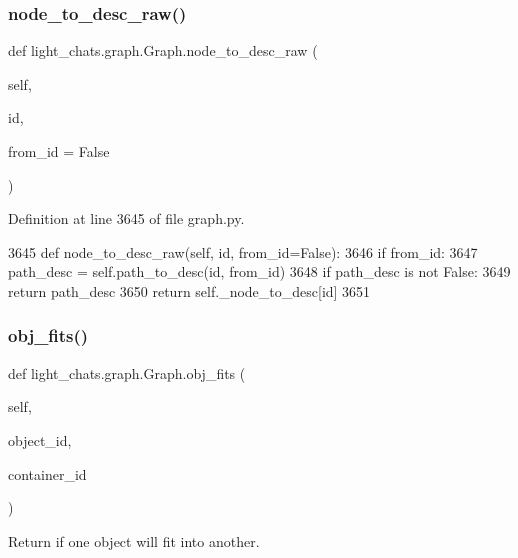 \subsubsection{\texorpdfstring{node\+\_\+to\+\_\+desc\+\_\+raw()}{node\_to\_desc\_raw()}}
{\footnotesize\ttfamily def light\+\_\+chats.\+graph.\+Graph.\+node\+\_\+to\+\_\+desc\+\_\+raw (\begin{DoxyParamCaption}\item[{}]{self,  }\item[{}]{id,  }\item[{}]{from\+\_\+id = {\ttfamily False} }\end{DoxyParamCaption})}



Definition at line 3645 of file graph.\+py.


\begin{DoxyCode}
3645     \textcolor{keyword}{def }node\_to\_desc\_raw(self, id, from\_id=False):
3646         \textcolor{keywordflow}{if} from\_id:
3647             path\_desc = self.path\_to\_desc(id, from\_id)
3648             \textcolor{keywordflow}{if} path\_desc \textcolor{keywordflow}{is} \textcolor{keywordflow}{not} \textcolor{keyword}{False}:
3649                 \textcolor{keywordflow}{return} path\_desc
3650         \textcolor{keywordflow}{return} self.\_node\_to\_desc[id]
3651 
\end{DoxyCode}
\mbox{\label{classlight__chats_1_1graph_1_1Graph_af7460b9c8069563289b8b6b11f831b63}} 
\subsubsection{\texorpdfstring{obj\+\_\+fits()}{obj\_fits()}}
{\footnotesize\ttfamily def light\+\_\+chats.\+graph.\+Graph.\+obj\+\_\+fits (\begin{DoxyParamCaption}\item[{}]{self,  }\item[{}]{object\+\_\+id,  }\item[{}]{container\+\_\+id }\end{DoxyParamCaption})}

\begin{DoxyVerb}Return if one object will fit into another.
\end{DoxyVerb}
 

